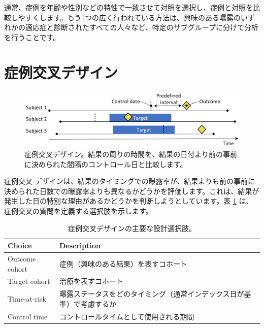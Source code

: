 \documentclass[
  11pt]{book}
\theoremstyle{definition}
\theoremstyle{definition}
\theoremstyle{definition}
\theoremstyle{definition}
\theoremstyle{remark}
\begin{document}
通常、症例を年齢や性別などの特性で一致させて対照を選択し、症例と対照を比較しやすくします。もう1つの広く行われている方法は、興味のある曝露のいずれかの適応症と診断されたすべての人々など、特定のサブグループに分けて分析を行うことです。

\section{症例交叉デザイン}\label{ux75c7ux4f8bux4ea4ux53c9ux30c7ux30b6ux30a4ux30f3}


\begin{figure}[h]

{\centering \includegraphics[width=0.9\linewidth]{images/PopulationLevelEstimation/caseCrossover} 

}

\caption{症例交叉デザイン。結果の周りの時間を、結果の日付より前の事前に決められた間隔のコントロール日と比較します。}\label{fig:caseCrossover}
\end{figure}

症例交叉 \citep{maclure_1991} デザインは、結果のタイミングでの曝露率が、結果よりも前の事前に決められた日数での曝露率よりも異なるかどうかを評価します。これは、結果が発生した日の特別な理由があるかどうかを判断しようとしています。表 \ref{tab:ccrChoices} は、症例交叉の質問を定義する選択肢を示します。 

\begin{table}
\centering
\caption{\label{tab:ccrChoices}症例交叉デザインの主要な設計選択肢。}
\centering
\begin{tabular}[t]{l>{\raggedright\arraybackslash}p{9cm}}
\toprule
Choice & Description\\
\midrule
Outcome cohort & 症例（興味のある結果）を表すコホート\\
Target cohort & 治療を表すコホート\\
Time-at-risk & 曝露ステータスをどのタイミング（通常インデックス日が基準）で考慮するか\\
Control time & コントロールタイムとして使用される期間\\
\bottomrule
\end{tabular}
\end{table}
\end{document}
